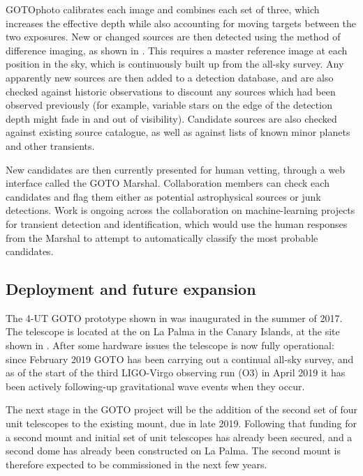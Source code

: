 \begin{colsection}
\begin{colsection}
GOTOphoto calibrates each image and combines each set of three, which increases the effective depth while also accounting for moving targets between the two exposures. New or changed sources are then detected using the method of difference imaging, as shown in . This requires a master reference image at each position in the sky, which is continuously built up from the all-sky survey. Any apparently new sources are then added to a detection database, and are also checked against historic observations to discount any sources which had been observed previously (for example, variable stars on the edge of the detection depth might fade in and out of visibility). Candidate sources are also checked against existing source catalogue, as well as against lists of known minor planets and other transients.

New candidates are then currently presented for human vetting, through a web interface called the GOTO Marshal. Collaboration members can check each candidates and flag them either as potential astrophysical sources or junk detections. Work is ongoing across the collaboration on machine-learning projects for transient detection and identification, which would use the human responses from the Marshal to attempt to automatically classify the most probable candidates.

\end{colsection}


\subsection{Deployment and future expansion}
\label{sec:goto_expansion}
\begin{colsection}

The 4-UT GOTO prototype shown in  was inaugurated in the summer of 2017. The telescope is located at the  on La Palma in the Canary Islands, at the site shown in . After some hardware issues the telescope is now fully operational: since February 2019 GOTO has been carrying out a continual all-sky survey, and as of the start of the third LIGO-Virgo observing run (O3) in April 2019 it has been actively following-up gravitational wave events when they occur.

The next stage in the GOTO project will be the addition of the second set of four unit telescopes to the existing mount, due in late 2019. Following that funding for a second mount and initial set of unit telescopes has already been secured, and a second dome has already been constructed on La Palma. The second mount is therefore expected to be commissioned in the next few years.


\end{colsection}
\end{colsection}
